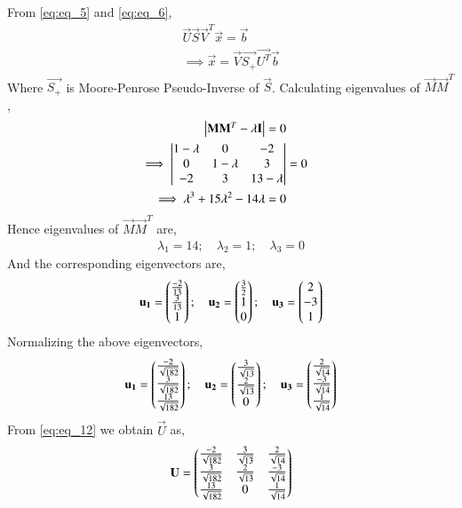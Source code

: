 \documentclass[journal,12pt,twocolumn]{IEEEtran}
\begin{document}
From \eqref{eq:eq_5} and \eqref{eq:eq_6},
\begin{align}
    \vec{U} \vec{S} \vec{V}^T \vec{x} = \vec{b} \nonumber \\
    \implies \vec{x} = \vec{V} \vec{S_+} \vec{U^T} \vec{b} \label{eq:eq_9}
\end{align}
Where $\vec{S_+}$ is Moore-Penrose Pseudo-Inverse of $\vec{S}$. Calculating eigenvalues of $\vec{M}\vec{M}^T$,
\begin{align}
    \begin{vmatrix}\mathbf{M} \mathbf{M}^T - \lambda \mathbf{I}\end{vmatrix} = 0 \nonumber \\
    \implies \begin{vmatrix}1-\lambda & 0 & -2 \\ 0 & 1-\lambda & 3 \\ -2 & 3 & 13-\lambda\end{vmatrix} &= 0 \nonumber \\
    \implies \lambda^3 + 15\lambda^2 - 14\lambda =0 \nonumber
\end{align}
Hence eigenvalues of $\vec{M}\vec{M}^T$ are,
\begin{align} \label{eq:eq_10}
    \lambda_1 = 14; \quad \lambda_2 = 1; \quad \lambda_3 =0
\end{align}
And the corresponding eigenvectors are,
\begin{align}
    \mathbf{u_1} = \begin{pmatrix}\frac{-2}{13} \\ \frac{3}{13} \\ 1\end{pmatrix}; \quad \mathbf{u_2} = \begin{pmatrix}\frac{3}{2} \\ 1 \\ 0\end{pmatrix}; \quad
    \mathbf{u_3} = \begin{pmatrix}2 \\ -3 \\ 1\end{pmatrix} \label{eq:eq_11} 
\end{align}
Normalizing the above eigenvectors,
\begin{align} 
    \mathbf{u_1} = \begin{pmatrix}\frac{-2}{\sqrt{182}} \\ \frac{3}{\sqrt{182}} \\ \frac{13}{\sqrt{182}}\end{pmatrix}; \quad 
    \mathbf{u_2} = \begin{pmatrix}\frac{3}{\sqrt{13}} \\ \frac{2}{\sqrt{13}} \\ 0\end{pmatrix}; \quad
    \mathbf{u_3} = \begin{pmatrix}\frac{2}{\sqrt{14}} \\ \frac{-3}{\sqrt{14}} \\ \frac{1}{\sqrt{14}}\end{pmatrix} \label{eq:eq_12}
\end{align}
From \eqref{eq:eq_12} we obtain $\vec{U}$ as,
\begin{align} \label{eq:eq_13}
    \mathbf{U} = \begin{pmatrix}\frac{-2}{\sqrt{182}} & \frac{3}{\sqrt{13}} & \frac{2}{\sqrt{14}} \\ \frac{3}{\sqrt{182}} & \frac{2}{\sqrt{13}} & \frac{-3}{\sqrt{14}} \\ \frac{13}{\sqrt{182}} & 0 & \frac{1}{\sqrt{14}}\end{pmatrix}
\end{align}
\end{document}
